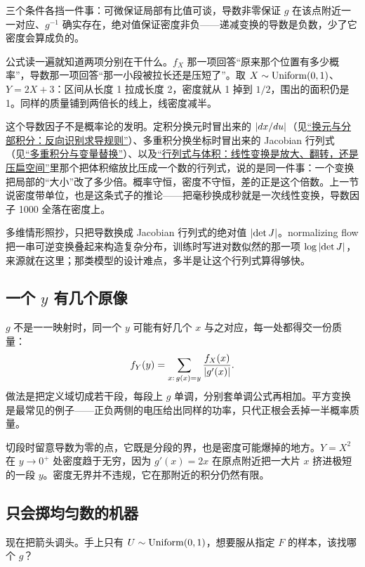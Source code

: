 三个条件各挡一件事：可微保证局部有比值可谈，导数非零保证 \(g\) 在该点附近一一对应、\(g^{-1}\) 确实存在，绝对值保证密度非负——递减变换的导数是负数，少了它密度会算成负的。

公式读一遍就知道两项分别在干什么。\(f_X\) 那一项回答``原来那个位置有多少概率''，导数那一项回答``那一小段被拉长还是压短了''。取 \(X\sim\operatorname{Uniform}(0,1)\)、\(Y=2X+3\)：区间从长度 1 拉成长度 2，密度就从 1 掉到 \(1/2\)，围出的面积仍是 1。同样的质量铺到两倍长的线上，线密度减半。

这个导数因子不是概率论的发明。定积分换元时冒出来的 \(\left|dx/du\right|\)（见\hyperref[sec:02-Calculus/04-Integration/03]{``换元与分部积分：反向识别求导规则''}）、多重积分换坐标时冒出来的 Jacobian 行列式（见\hyperref[sec:02-Calculus/06-Multivariable-Calculus/07]{``多重积分与变量替换''}）、以及\hyperref[sec:03-Linear-Algebra/04-Determinants/01]{``行列式与体积：线性变换是放大、翻转，还是压扁空间''}里那个把体积缩放比压成一个数的行列式，说的是同一件事：一个变换把局部的``大小''改了多少倍。概率守恒，密度不守恒，差的正是这个倍数。上一节说密度带单位，也是这条式子的推论——把毫秒换成秒就是一次线性变换，导数因子 1000 全落在密度上。

多维情形照抄，只把导数换成 Jacobian 行列式的绝对值 \(\left|\det J\right|\)。normalizing flow 把一串可逆变换叠起来构造复杂分布，训练时写进对数似然的那一项 \(\log\left|\det J\right|\)，来源就在这里；那类模型的设计难点，多半是让这个行列式算得够快。

\subsection{一个 \texorpdfstring{\(y\)}{y} 有几个原像}

\(g\) 不是一一映射时，同一个 \(y\) 可能有好几个 \(x\) 与之对应，每一处都得交一份质量：
\[
f_Y(y)=\sum_{x:\,g(x)=y}\frac{f_X(x)}{\left|g'(x)\right|}.
\]
做法是把定义域切成若干段，每段上 \(g\) 单调，分别套单调公式再相加。平方变换是最常见的例子——正负两侧的电压给出同样的功率，只代正根会丢掉一半概率质量。

切段时留意导数为零的点，它既是分段的界，也是密度可能爆掉的地方。\(Y=X^2\) 在 \(y\to0^{+}\) 处密度趋于无穷，因为 \(g'(x)=2x\) 在原点附近把一大片 \(x\) 挤进极短的一段 \(y\)。密度无界并不违规，它在那附近的积分仍然有限。

\subsection{只会掷均匀数的机器}

现在把箭头调头。手上只有 \(U\sim\operatorname{Uniform}(0,1)\)，想要服从指定 \(F\) 的样本，该找哪个 \(g\)？

